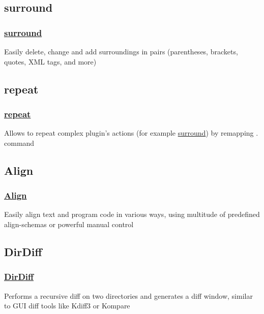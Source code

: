 \documentclass[14pt,svgnames,compress]{beamer}
\newcommand\hl[1]{\textcolor{HlColor}{#1}}
\begin{document}
\subsection{surround}

\begin{frame}
    \frametitle{
        \href{https://github.com/vim-scripts/surround.vim}
             {surround}
    }
    \large
    Easily delete, change and add surroundings in pairs (parentheses, brackets,
    quotes, XML tags, and more) \\
\end{frame}


\subsection{repeat}

\begin{frame}
    \frametitle{
        \href{https://github.com/vim-scripts/repeat.vim}
             {repeat}
    }
    \large
    Allows to repeat complex plugin's actions
    (for example \href{https://github.com/vim-scripts/surround.vim}{surround})
    by remapping \hl{.} command \\
\end{frame}


\subsection{Align}

\begin{frame}
    \frametitle{
        \href{https://github.com/vim-scripts/Align}
             {Align}
    }
    \large
    Easily align text and program code in various ways, using multitude of
    predefined align-schemas or powerful manual control \\
\end{frame}


\subsection{DirDiff}

\begin{frame}
    \frametitle{
        \href{https://github.com/vim-scripts/DirDiff.vim}
             {DirDiff}
    }
    \large
    Performs a recursive diff on two directories and generates a diff window,
    similar to GUI diff tools like \hl{Kdiff3} or \hl{Kompare} \\
\end{frame}
\end{document}
